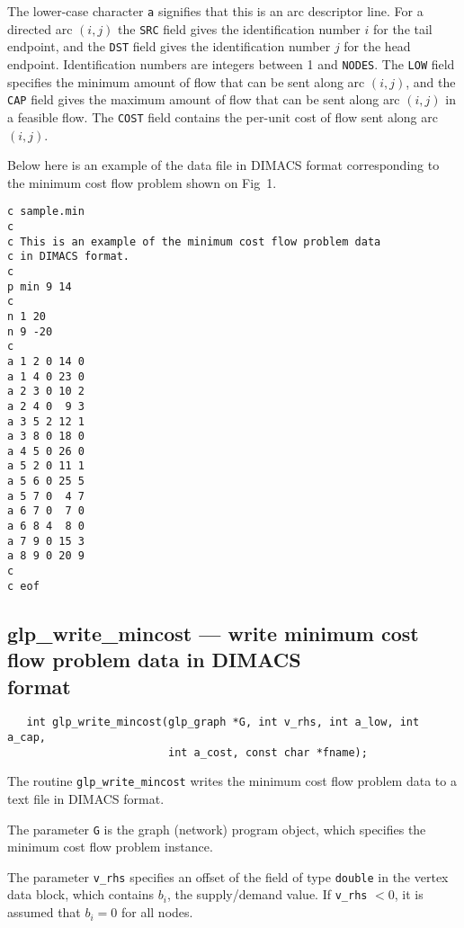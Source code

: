 \documentclass[11pt]{report}
\def\para#1{\noindent{\bf#1}}
\def\synopsis{\para{Synopsis}}
\def\description{\para{Description}}
\begin{document}
\noindent
The lower-case character \verb|a| signifies that this is an arc
descriptor line. For a directed arc $(i,j)$ the \verb|SRC| field gives
the identification number $i$ for the tail endpoint, and the \verb|DST|
field gives the identification number $j$ for the head endpoint.
Identification numbers are integers between 1 and \verb|NODES|. The
\verb|LOW| field specifies the minimum amount of flow that can be sent
along arc $(i,j)$, and the \verb|CAP| field gives the maximum amount of
flow that can be sent along arc $(i,j)$ in a feasible flow. The
\verb|COST| field contains the per-unit cost of flow sent along arc
$(i,j)$.

\para{Example.} Below here is an example of the data file in DIMACS
format corresponding to the minimum cost flow problem shown on Fig~1.

\begin{footnotesize}
\begin{verbatim}
c sample.min
c
c This is an example of the minimum cost flow problem data
c in DIMACS format.
c
p min 9 14
c
n 1 20
n 9 -20
c
a 1 2 0 14 0
a 1 4 0 23 0
a 2 3 0 10 2
a 2 4 0  9 3
a 3 5 2 12 1
a 3 8 0 18 0
a 4 5 0 26 0
a 5 2 0 11 1
a 5 6 0 25 5
a 5 7 0  4 7
a 6 7 0  7 0
a 6 8 4  8 0
a 7 9 0 15 3
a 8 9 0 20 9
c
c eof
\end{verbatim}
\end{footnotesize}

\subsection{glp\_write\_mincost --- write minimum cost flow problem
data in DIMACS\\format}

\synopsis

\begin{verbatim}
   int glp_write_mincost(glp_graph *G, int v_rhs, int a_low, int a_cap,
                         int a_cost, const char *fname);
\end{verbatim}

\description

The routine \verb|glp_write_mincost| writes the minimum cost flow
problem data to a text file in DIMACS format.

The parameter \verb|G| is the graph (network) program object, which
specifies the minimum cost flow problem instance.

The parameter \verb|v_rhs| specifies an offset of the field of type
\verb|double| in the vertex data block, which contains $b_i$, the
supply/demand value. If \verb|v_rhs| $<0$, it is assumed that $b_i=0$
for all nodes.
\end{document}
